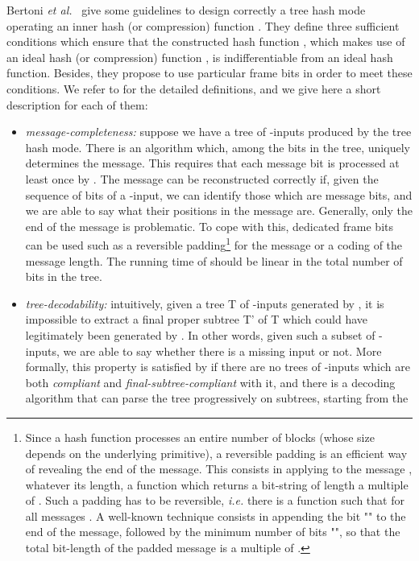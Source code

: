\documentclass{llncs}
\begin{document}
Bertoni \textit{et al.}~\cite{BDPV09,BDPV14_Suf}
give some guidelines to design correctly a tree hash mode  operating an inner hash (or compression) function . 
They define three sufficient conditions which ensure that the constructed hash function , which makes use of 
an ideal hash (or compression) function ,
is indifferentiable from an ideal hash function. Besides, they propose to use particular frame bits in order to meet these conditions.
We refer to \cite{BDPV09,BDPV14_Suf} for the detailed definitions, and we give here a short description for each of them:
\begin{itemize}
 \item \textit{message-completeness:} 
 suppose we have a tree of -inputs produced by the tree hash mode. There is an algorithm  which, among the bits in the tree, 
 uniquely determines the message. 
 This requires that each message bit is processed at least once by . The message can be reconstructed correctly if, given the sequence of bits of a -input, 
 we can identify those which are message bits, and we are able to say what their positions in the message are. 
Generally, only the end of the message is problematic. To cope with this, dedicated frame bits can be used such as a reversible 
 padding\footnote{Since a hash function processes an entire number of blocks (whose size  depends on the underlying primitive), 
 a reversible padding is an efficient way of revealing the end of the message. This consists in applying to the message , whatever its length, 
 a function  which returns a bit-string of length a multiple of .
 Such a padding has to be reversible, \emph{i.e.} there is a function  such that  for all messages .
 A well-known technique consists in appending the bit "" to the end of the message, followed by the minimum number of bits "", so that the total bit-length of the 
 padded message is a multiple of .} for the message or a coding of the message length.
 The running time of  should be linear in the total number of bits in the tree.
\item \emph{tree-decodability:} 
intuitively, given a tree T of -inputs generated by , it is impossible to extract a final proper subtree T' of T 
which could have legitimately been generated by . 
In other words, given such a subset of -inputs, we are able to say whether there is a missing input or not. More formally,
 this property is satisfied by  if there are no trees of -inputs which are both \emph{compliant} and \emph{final-subtree-compliant} with it, and there is a decoding
 algorithm  that can parse the tree progressively on subtrees, starting from the

\end{itemize}
\end{document}
